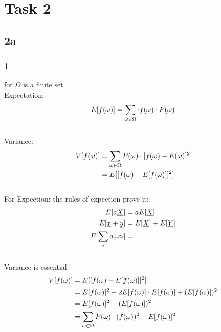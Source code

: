 \documentclass{article}
\begin{document}
\section*{Task 2}
\subsection*{2a}
\subsubsection*{1}
for $\Omega$ is a finite set \\[15pt]
Expectation:
\begin{equation}\notag
\begin{aligned} 
E[f(\omega)]=\sum\limits_{\omega \in \Omega} \cdot f(\omega)\cdot P(\omega)
\end{aligned}
\end{equation}
\\[15pt]
Variance:
\begin{equation}\notag
\begin{aligned}
V[f(\omega)] &=\sum\limits_{\omega \in \Omega}P(\omega)\cdot [f(\omega)-E(\omega)]^2
\\
&=E[[f(\omega)-E[f(\omega)]]^2]
\end{aligned}
\end{equation}
\\
For Expection: the rules of  expection prove it:\\
\begin{equation}\notag
\begin{aligned}
E[a\uline{X}] &= aE[\uline{X}]\\
E[\uline{x}+\uline{y}]&= E[\uline{X}]+E[\uline{Y}]\\
E[\sum\limits_{i} a_x x_i]&=
\end{aligned}
\end{equation}
\\
Variance is essential \\
\begin{equation}\notag
\begin{aligned}
V[f(\omega)]&=E[[f(\omega)-E[f(\omega)]]^2]\\
&=E[f(\omega)]^2-2E[f(\omega)]\cdot E[f(\omega)]+(E[f(\omega)])^2\\
&=E[f(\omega)]^2-(E[f(\omega)])^2\\
&=\sum\limits_{\omega \in \Omega}P(\omega) \cdot (f(\omega))^2-E[f(\omega)]^2
\end{aligned}
\end{equation}
\newpage
\end{document}
